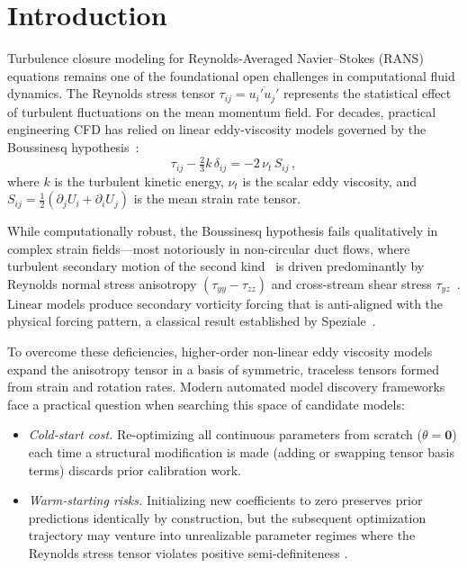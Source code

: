 \documentclass[preprint,aps,prb,longbibliography,superscriptaddress]{revtex4-2}
\begin{document}
\maketitle

\section{Introduction}\label{sec:intro}

Turbulence closure modeling for Reynolds-Averaged Navier--Stokes (RANS)
equations remains one of the foundational open challenges in computational
fluid dynamics. The Reynolds stress tensor
$\tau_{ij} = \overline{u_i' u_j'}$ represents the statistical effect of
turbulent fluctuations on the mean momentum field. For decades, practical
engineering CFD has relied on linear eddy-viscosity models governed by the
Boussinesq hypothesis~\cite{Boussinesq1877}:
\begin{equation}\label{eq:boussinesq}
  \tau_{ij} - \tfrac{2}{3}k\,\delta_{ij} = -2\,\nu_t\, S_{ij}\,,
\end{equation}
where $k$ is the turbulent kinetic energy, $\nu_t$ is the scalar eddy
viscosity, and $S_{ij} = \tfrac{1}{2}(\partial_j U_i + \partial_i U_j)$ is
the mean strain rate tensor.

While computationally robust, the Boussinesq hypothesis fails qualitatively in
complex strain fields---most notoriously in non-circular duct flows, where
turbulent secondary motion of the second kind~\cite{Prandtl1926} is driven
predominantly by Reynolds normal stress anisotropy
$(\tau_{yy} - \tau_{zz})$ and cross-stream shear stress
$\tau_{yz}$~\cite{Speziale1987}. Linear models produce secondary vorticity
forcing that is anti-aligned with the physical forcing pattern, a classical
result established by Speziale~\cite{Speziale1987}.

To overcome these deficiencies, higher-order non-linear eddy viscosity models
\cite{Pope1975,Craft1996,Wallin2000} expand the anisotropy tensor in a basis of
symmetric, traceless tensors formed from strain and rotation rates. Modern
automated model discovery frameworks face a practical question when searching
this space of candidate models:
\begin{itemize}
  \item \textit{Cold-start cost.} Re-optimizing all continuous parameters from
    scratch ($\theta = \mathbf{0}$) each time a structural modification is made
    (adding or swapping tensor basis terms) discards prior calibration work.
  \item \textit{Warm-starting risks.} Initializing new coefficients to zero
    preserves prior predictions identically by construction, but the
    subsequent optimization trajectory may venture into unrealizable parameter
    regimes where the Reynolds stress tensor violates positive semi-definiteness
    \cite{Schumann1977,Lumley1978}.
\end{itemize}
\end{document}
